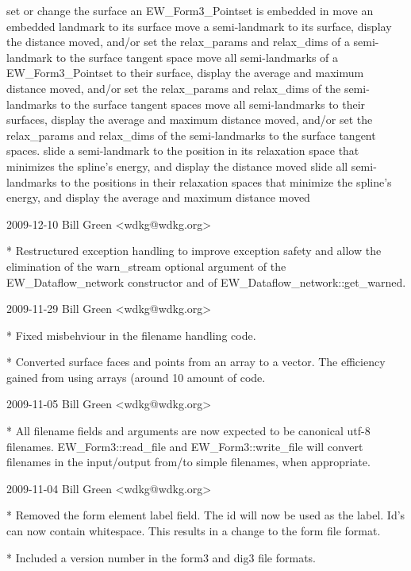 \begin{DoxyVerbInclude}
        set or change the surface an EW_Form3_Pointset is embedded in
         move an embedded landmark to its surface
        move a semi-landmark to its surface, display the distance moved, and/or
         set the relax_params and relax_dims of a semi-landmark to the surface
         tangent space
        move all semi-landmarks of a EW_Form3_Pointset to their surface,
         display the average and maximum distance moved, and/or set the
         relax_params and relax_dims of the semi-landmarks to the surface
         tangent spaces
        move all semi-landmarks to their surfaces, display the average and
         maximum distance moved, and/or set the relax_params and relax_dims of
         the semi-landmarks to the surface tangent spaces.
        slide a semi-landmark to the position in its relaxation space that
         minimizes the spline's energy, and display the distance moved
        slide all semi-landmarks to the positions in their relaxation spaces
         that minimize the spline's energy, and display the average and
         maximum distance moved


2009-12-10  Bill Green  <wdkg@wdkg.org>

    * Restructured exception handling to improve exception safety and allow the
    elimination of the warn_stream optional argument of the
    EW_Dataflow_network constructor and of EW_Dataflow_network::get_warned.


2009-11-29  Bill Green  <wdkg@wdkg.org>

    * Fixed misbehviour in the filename handling code.

    * Converted surface faces and points from an array to a vector.
    The efficiency gained from using arrays (around 10%
    amount of code.


2009-11-05  Bill Green  <wdkg@wdkg.org>

    * All filename fields and arguments are now expected to be canonical
    utf-8 filenames.
    EW_Form3::read_file and EW_Form3::write_file will convert filenames in
    the input/output from/to simple filenames, when appropriate.


2009-11-04  Bill Green  <wdkg@wdkg.org>

    * Removed the form element label field.
    The id will now be used as the label.
    Id's can now contain whitespace.
    This results in a change to the form file format.

    * Included a version number in the form3 and dig3 file formats.



\end{DoxyVerbInclude}
